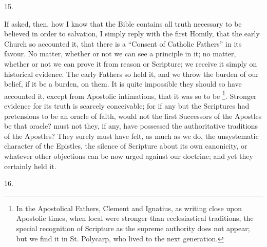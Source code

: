 15.

If asked, then, how I know that the Bible contains all truth
necessary to be believed in order to salvation, I simply reply with
the first Homily, that the early Church so accounted it, that there is
a ``Consent of Catholic Fathers'' in its favour. No matter,
whether or not we can see a principle in it; no matter, whether or not
we can prove it from reason or Scripture; we receive it simply on
historical evidence. The early Fathers so held it, and we throw the
burden of our belief, if it be a burden, on them. It is quite
impossible they should so have accounted it, except from Apostolic
intimations, that it was so to be \footnote{In the Apostolical Fathers, Clement and
Ignatius, as writing close upon Apostolic times, when local were
stronger than ecclesiastical traditions, the special recognition of
Scripture as the supreme authority does not appear; but we find it in
St. Polycarp, who lived to the next generation.}. Stronger evidence for its truth is scarcely conceivable; for
if any but the Scriptures had pretensions to be an oracle of faith,
would not the first Successors of the Apostles be that oracle? must
not they, if any, have possessed the authoritative traditions of the
Apostles? They surely must have felt, as much as we do, the
unsystematic character of the Epistles, the silence of Scripture about
its own canonicity, or whatever other objections can be now urged
against our doctrine; and yet they certainly held it.

16.

